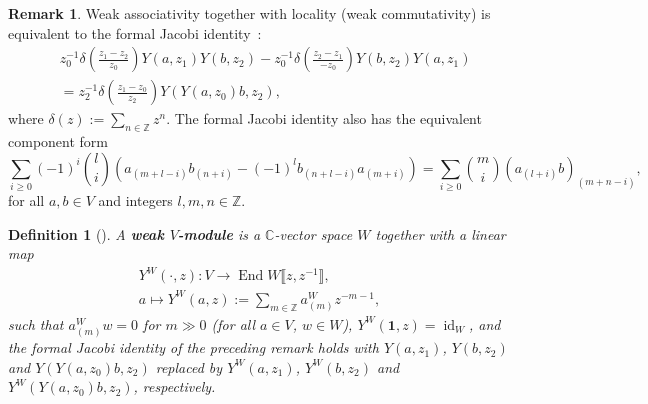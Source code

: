 \documentclass[12pt,a4paper,reqno]{amsart}
\numberwithin{equation}{section}
\newtheorem{definition}[theorem]{Definition}
\theoremstyle{definition}
\newtheorem{remark}[theorem]{Remark}
\newcommand{\End}{\operatorname{End}}
\newcommand{\id}{\operatorname{id}}
\newcommand{\C}{\mathbb{C}}
\newcommand{\Z}{\mathbb{Z}}
\newcommand{\lb}{\llbracket}
\newcommand{\rb}{\rrbracket}
\def\vac{\mathbf{1}}
\begin{document}
\begin{remark}
Weak associativity together with locality (weak commutativity) is equivalent to the formal Jacobi identity~\cite[Proposition 3.4.3]{LL04}:
    \begin{equation}
        \begin{split}
            &z_0^{-1} \delta\left( \frac{z_1-z_2}{z_0}\right) Y(a,z_1)Y(b,z_2) - z_0^{-1} \delta\left( \frac{z_2-z_1}{-z_0}\right) Y(b,z_2)Y(a,z_1) \\&= z_2^{-1} \delta\left(\frac{z_1-z_0}{z_2}\right) Y(Y(a,z_0)b,z_2),
        \end{split}
    \end{equation}
    where $\delta(z):= \sum_{n\in \Z} z^n$. The formal Jacobi identity also has the equivalent component form
    \begin{equation}\label{eq:componentJacobi}
    \sum_{i \ge 0} (-1)^i \binom{l}{i} \left( a_{(m+l-i)} b_{(n+i)} - (-1)^l b_{(n+l-i)} a_{(m+i)} \right) = \sum_{i \ge 0} \binom{m}{i} (a_{(l+i)}b)_{(m+n-i)},
\end{equation}
for all $a, b \in V$ and integers $l, m, n\in\Z$.
\end{remark}
\begin{definition}[{\cite[p.2]{DLM2}}]
    A \textbf{weak $V$-module} is a $\C$-vector space $W$ together with a linear map
    \begin{equation}
        \begin{split}
            Y^W(\cdot, z): V \rightarrow \End W\lb z, z^{-1} \rb,\\
            a \mapsto Y^W(a,z):=\sum_{m \in \Z} a^W_{(m)}z^{-m-1},
        \end{split}
    \end{equation}
    such that $a^W_{(m)}w=0$ for $m\gg 0$ (for all $a\in V$, $w\in W$), $Y^W(\vac,z)=\id_W$, and the formal Jacobi identity of the preceding remark holds with $Y(a,z_1)$, $Y(b,z_2)$ and $Y(Y(a,z_0)b,z_2)$ replaced by $Y^W(a,z_1)$, $Y^W(b,z_2)$ and $Y^W(Y(a,z_0)b,z_2)$, respectively.
\end{definition}
\end{document}
